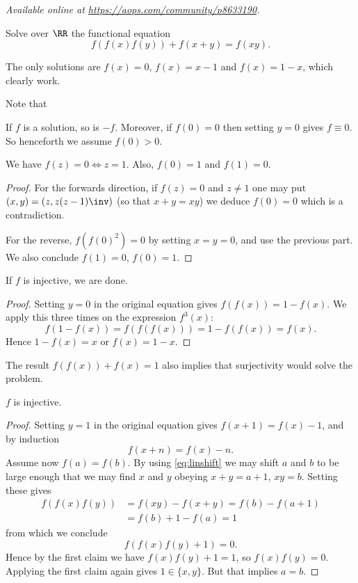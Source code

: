 \textsl{Available online at \url{https://aops.com/community/p8633190}.}
\begin{mdframed}[style=mdpurplebox,frametitle={Problem statement}]
Solve over $\RR$ the functional equation
\[ f\left( f(x)f(y) \right) + f(x+y) = f(xy). \]
\end{mdframed}
The only solutions are $f(x) = 0$, $f(x) = x-1$ and $f(x)=1-x$,
which clearly work.

Note that
\begin{itemize}
  \ii If $f$ is a solution, so is $-f$.
  \ii Moreover, if $f(0)=0$ then setting $y=0$ gives $f\equiv0$.
  So henceforth we assume $f(0)>0$.
\end{itemize}

\begin{claim*}
  We have $f(z) = 0 \iff z =1$.
  Also, $f(0)=1$ and $f(1)=0$.
\end{claim*}
\begin{proof}
  For the forwards direction, if $f(z)=0$ and $z \neq 1$
  one may put $(x,y) = \left( z, z(z-1)\inv \right)$
  (so that $x+y=xy$) we deduce $f(0) = 0$
  which is a contradiction.

  For the reverse, $f(f(0)^2)=0$ by setting $x=y=0$,
  and use the previous part.
  We also conclude $f(1) = 0$, $f(0) = 1$.
\end{proof}

\begin{claim*}
  If $f$ is injective, we are done.
\end{claim*}
\begin{proof}
  Setting $y=0$ in the original equation
  gives $f(f(x)) = 1-f(x)$.
  We apply this three times on the expression $f^3(x)$:
  \[ f(1-f(x)) = f(f(f(x))) = 1 - f(f(x)) = f(x). \]
  Hence $1-f(x) = x$ or $f(x) = 1-x$.
\end{proof}
\begin{remark*}
  The result $f(f(x)) + f(x) = 1$ also implies that surjectivity
  would solve the problem.
\end{remark*}

\begin{claim*}
  $f$ is injective.
\end{claim*}
\begin{proof}
  Setting $y=1$ in the original equation gives
  $f(x+1) = f(x)-1$, and by induction
  \begin{equation}
    f(x+n) = f(x)-n.
    \label{eq:linshift}
  \end{equation}
  Assume now $f(a) = f(b)$.
  By using \eqref{eq:linshift} we may shift $a$ and $b$
  to be large enough that
  we may find $x$ and $y$ obeying $x+y=a+1$, $xy=b$.
  Setting these gives
  \begin{align*}
    f(f(x)f(y)) &= f(xy) - f(x+y) = f(b) - f(a+1) \\
    &= f(b) + 1 - f(a) = 1
  \end{align*}
  from which we conclude
  \[ f\left( f(x)f(y) + 1 \right) = 0. \]
  Hence by the first claim
  we have $f(x)f(y) + 1 = 1$, so $f(x)f(y) = 0$.
  Applying the first claim again gives $1 \in \{x,y\}$.
  But that implies $a=b$.
\end{proof}

